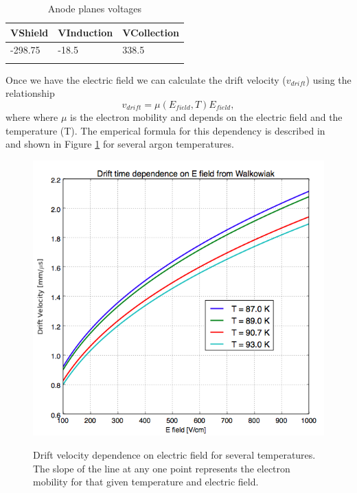 \begin{table}[htpb]
\centering
\caption{Anode planes voltages}
\label{tab:voltages}
\begin{tabular}{lll}
\hline
\multicolumn{1}{|l|}{VShield} & \multicolumn{1}{l|}{VInduction} & \multicolumn{1}{l|}{VCollection} \\ \hline
\multicolumn{1}{|l|}{-298.75} & \multicolumn{1}{l|}{-18.5}      & \multicolumn{1}{l|}{338.5}       \\ \hline
                              &                                 &                                 
\end{tabular}
\end{table}

Once we have the electric field we can calculate the drift velocity ($v_{drift}$) using the relationship
\begin{equation} v_{drift} = \mu(E_{field},T) E_{field}, \label{eq:vd}
\end{equation}
where where $\mu$ is the electron mobility and depends on the electric field and the temperature (T). The emperical formula for this dependency is described in ~\cite{WWW} and shown in Figure \ref{fig:EV} for several argon temperatures.

\begin{figure}[htb]
\centering
\includegraphics[scale=0.45]{./images/Walkowiak.png}\\
\caption{Drift velocity dependence on electric field for several temperatures. The slope of the line at any one point represents the electron mobility for that given temperature and electric field.}
\label{fig:EV}
\end{figure}

